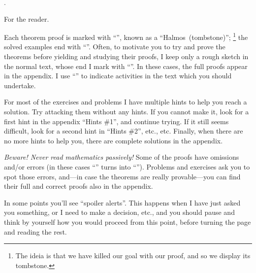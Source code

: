 
\chapteroid \prefacename.

\sectionoid For the reader.

Each theorem proof is marked with ``\thinspace\qedsymbol\thinspace'',
known as a ``Halmos\Halmos[tombstone]~(tombstone)'';%
\footnote{The ideia is that we have killed our goal with our proof,
and so we display its tombstone.}
the solved examples end with ``\thinspace\qexsymbol\thinspace''.
Often, to motivate you to try and prove the theorems before yielding and studying their proofs,
I keep only a rough sketch in the normal text, whose end I mark with
``\thinspace\qessymbol\thinspace''.
In these cases, the full proofs appear in the appendix.
I use ``\thinspace\activitysymbol\thinspace'' to indicate activities in the text
which you should undertake.

For most of the exercises and problems I have multiple hints to help you
reach a solution.  Try attacking them without any hints.
If you cannot make it, look for a first hint in the appendix ``Hints \#1'',
and continue trying.
If it still seems difficult, look for a second hint in ``Hints \#2'', etc., etc.
Finally, when there are no more hints to help you,
there are complete solutions in the appendix.

\emph{Beware!  Never read mathematics passively!}
Some of the proofs have omissions and/or errors
(in these cases ``\thinspace\qedsymbol\thinspace''
turns into ``\thinspace\mistakesymbol\thinspace'').
Problems and exercises ask you to spot those errors,
and---in case the theorems are really provable---you
can find their full and correct proofs also in the appendix.

In some points you'll see ``spoiler alerts''.
This happens when I have just asked you something, or I need
to make a decision, etc., and you should pause and think by yourself
how you would proceed from this point, before turning the page
and reading the rest.

\endsectionoid

\endchapteroid
